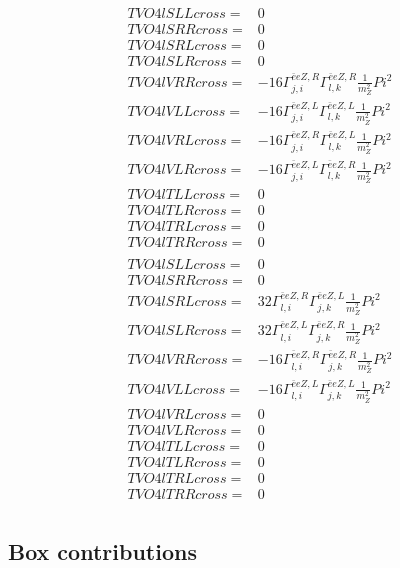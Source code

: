 \documentclass[A4,landscape]{article}
\begin{document}
\begin{align} 
  TVO4lSLLcross= & 0 \\ 
  TVO4lSRRcross= & 0 \\ 
  TVO4lSRLcross= & 0 \\ 
  TVO4lSLRcross= & 0 \\ 
  TVO4lVRRcross= & -16 \Gamma^{\bar{e}e Z ,R}_{j, i} \Gamma^{\bar{e}e Z ,R}_{l, k} \frac{1}{m^2_{Z}} Pi^2 \\ 
  TVO4lVLLcross= & -16 \Gamma^{\bar{e}e Z ,L}_{j, i} \Gamma^{\bar{e}e Z ,L}_{l, k} \frac{1}{m^2_{Z}} Pi^2 \\ 
  TVO4lVRLcross= & -16 \Gamma^{\bar{e}e Z ,R}_{j, i} \Gamma^{\bar{e}e Z ,L}_{l, k} \frac{1}{m^2_{Z}} Pi^2 \\ 
  TVO4lVLRcross= & -16 \Gamma^{\bar{e}e Z ,L}_{j, i} \Gamma^{\bar{e}e Z ,R}_{l, k} \frac{1}{m^2_{Z}} Pi^2 \\ 
  TVO4lTLLcross= & 0 \\ 
  TVO4lTLRcross= & 0 \\ 
  TVO4lTRLcross= & 0 \\ 
  TVO4lTRRcross= & 0 \\ 
\end{align} 
\begin{align} 
  TVO4lSLLcross= & 0 \\ 
  TVO4lSRRcross= & 0 \\ 
  TVO4lSRLcross= & 32 \Gamma^{\bar{e}e Z ,R}_{l, i} \Gamma^{\bar{e}e Z ,L}_{j, k} \frac{1}{m^2_{Z}} Pi^2 \\ 
  TVO4lSLRcross= & 32 \Gamma^{\bar{e}e Z ,L}_{l, i} \Gamma^{\bar{e}e Z ,R}_{j, k} \frac{1}{m^2_{Z}} Pi^2 \\ 
  TVO4lVRRcross= & -16 \Gamma^{\bar{e}e Z ,R}_{l, i} \Gamma^{\bar{e}e Z ,R}_{j, k} \frac{1}{m^2_{Z}} Pi^2 \\ 
  TVO4lVLLcross= & -16 \Gamma^{\bar{e}e Z ,L}_{l, i} \Gamma^{\bar{e}e Z ,L}_{j, k} \frac{1}{m^2_{Z}} Pi^2 \\ 
  TVO4lVRLcross= & 0 \\ 
  TVO4lVLRcross= & 0 \\ 
  TVO4lTLLcross= & 0 \\ 
  TVO4lTLRcross= & 0 \\ 
  TVO4lTRLcross= & 0 \\ 
  TVO4lTRRcross= & 0 \\ 
\end{align} 
\subsection{Box contributions} 
\end{document}
